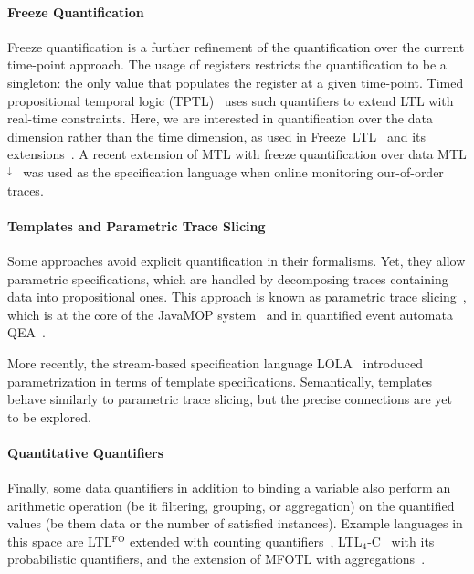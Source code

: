 \documentclass{article}
\begin{document}
\paragraph{Freeze Quantification}

Freeze quantification is a further refinement of the quantification over the current time-point approach. The usage of registers restricts the quantification to be a singleton: the only value that populates the register at a given time-point.
Timed propositional temporal logic (TPTL)~\cite{AlurH94} uses such quantifiers to extend LTL with real-time constraints. Here, we are interested in quantification over the data dimension rather than the time dimension, as used in Freeze~LTL~\cite{DemriLN07} and its extensions~\cite{DeckerT16}. A recent extension of MTL with freeze quantification over data MTL$^\downarrow$~\cite{BasinKZ17} was used as the specification language when online monitoring our-of-order traces.

\paragraph{Templates and Parametric Trace Slicing}

Some approaches avoid explicit quantification in their formalisms. Yet, they allow parametric specifications, which are handled by decomposing traces containing data into propositional ones. This approach is known as parametric trace slicing~\cite{ChenR09,RegerR15}, which is at the core of the JavaMOP system~\cite{MeredithJGCR12} and in quantified event automata 
QEA~\cite{BarringerFHRR12}.

More recently, the stream-based specification language LOLA~\cite{FaymonvilleFST16} introduced parametrization in terms of template specifications. Semantically, templates behave similarly to parametric trace slicing, but the precise connections are yet to be explored.

\paragraph{Quantitative Quantifiers}

Finally, some data quantifiers in addition to binding a variable also perform an arithmetic operation (be it filtering, grouping, or aggregation) on the quantified values (be them data or the number of satisfied instances).
Example languages in this space are
LTL$^{\text{FO}}$ extended with counting quantifiers~\cite{BauerGT09},
LTL$_4$-C~\cite{MedhatBFJ16} with its probabilistic quantifiers, and the extension of MFOTL with aggregations~\cite{BasinKMaZ15}.

\setlength{\bibsep}{5pt plus .5pt minus .25pt}


\end{document}
